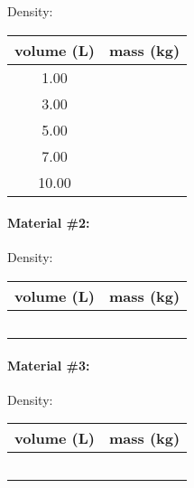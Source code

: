 \documentclass[10pt]{exam}
\begin{document}
\begin{questions}
\begin{multicols}{3}
      Density: \fillin[][7em]
  
      \begin{tabular}{|c|c|}
        \hline
        volume (L) & mass (kg) \\\hline
        1.00  &\\[1em]\hline
        3.00  &\\[1em]\hline
        5.00  &\\[1em]\hline
        7.00  &\\[1em]\hline
        10.00 &\\[1em]\hline
      \end{tabular}


      \paragraph{Material \#2:} \fillin[][5em]
    
      Density: \fillin[][7em]
  
      \begin{tabular}{|c|c|}
        \hline
        volume (L) & mass (kg) \\\hline
          &\\[1em]\hline
          &\\[1em]\hline
          &\\[1em]\hline
          &\\[1em]\hline
          &\\[1em]\hline
      \end{tabular}


      \paragraph{Material \#3:} \fillin[][5em]
    
      Density: \fillin[][7em]
  
      \begin{tabular}{|c|c|}
        \hline
        volume (L) & mass (kg) \\\hline
        &\\[1em]\hline
        &\\[1em]\hline
        &\\[1em]\hline
        &\\[1em]\hline
        &\\[1em]\hline
      \end{tabular}

    \end{multicols}


\end{questions}
\end{document}
